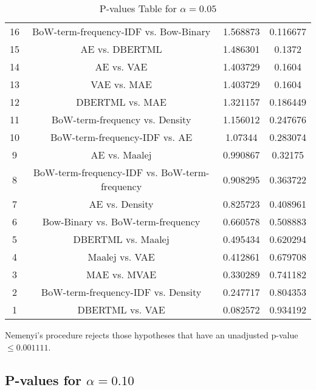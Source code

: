 \documentclass[a4paper,10pt]{article}
\begin{document}
\begin{landscape}
\begin{table}[!htp]
\begin{tabular}{cccc}
16&BoW-term-frequency-IDF vs. Bow-Binary&1.568873&0.116677\\
15&AE vs. DBERTML&1.486301&0.1372\\
14&AE vs. VAE&1.403729&0.1604\\
13&VAE vs. MAE&1.403729&0.1604\\
12&DBERTML vs. MAE&1.321157&0.186449\\
11&BoW-term-frequency vs. Density&1.156012&0.247676\\
10&BoW-term-frequency-IDF vs. AE&1.07344&0.283074\\
9&AE vs. Maalej&0.990867&0.32175\\
8&BoW-term-frequency-IDF vs. BoW-term-frequency&0.908295&0.363722\\
7&AE vs. Density&0.825723&0.408961\\
6&Bow-Binary vs. BoW-term-frequency&0.660578&0.508883\\
5&DBERTML vs. Maalej&0.495434&0.620294\\
4&Maalej vs. VAE&0.412861&0.679708\\
3&MAE vs. MVAE&0.330289&0.741182\\
2&BoW-term-frequency-IDF vs. Density&0.247717&0.804353\\
1&DBERTML vs. VAE&0.082572&0.934192\\
\hline
\end{tabular}
\caption{P-values Table for $\alpha=0.05$}
\end{table}Nemenyi's procedure rejects those hypotheses that have an unadjusted p-value $\le0.001111$.

\pagebreak

\subsection{P-values for $\alpha=0.10$}


\end{landscape}
\end{document}
